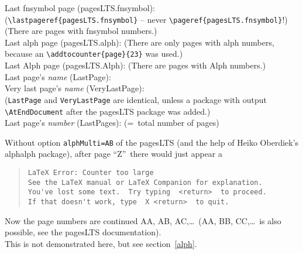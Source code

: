 \documentclass[british]{article}
\def\pagesLTSexamplealph{23}
\begin{document}
\noindent Last fnsymbol page (pagesLTS.fnsymbol):  \\
(\texttt{\textbackslash lastpageref\{pagesLTS.fnsymbol\}} -- never
\texttt{\textbackslash pageref\{pagesLTS.fnsymbol\}}!)\\
(There are  pages with fnsymbol numbers.)\\

\noindent Last alph page (pagesLTS.alph): 
(There are only  pages with alph numbers,
because an \texttt{\textbackslash addtocounter\{page\}\{\pagesLTSexamplealph\}} was used.)\\

\noindent Last Alph page (pagesLTS.Alph): 
(There are  pages with Alph numbers.)\\

\noindent Last page's \textit{name} (LastPage): \\

\noindent Very last page's \textit{name} (VeryLastPage): \\
(\texttt{LastPage} and \texttt{VeryLastPage} are identical, unless
a package with output \linebreak
\texttt{\textbackslash AtEndDocument} after the \textsf{pagesLTS} package
was added.)\\

\noindent Last page's \textit{number} (LastPages): 
(=~total number of pages)\\

\lipsum[1-3]

Without option \texttt{alphMulti=AB} of the \textsf{pagesLTS} (and the help of
Heiko Oberdiek's \textsf{alphalph} package), after page
\textquotedblleft Z\textquotedblright\ there would just appear a
\begin{quote}
\begin{verbatim}
LaTeX Error: Counter too large
See the LaTeX manual or LaTeX Companion for explanation.
You've lost some text.  Try typing  <return>  to proceed.
If that doesn't work, type  X <return>  to quit.
\end{verbatim}
\end{quote}
Now the page numbers are continued AA, AB, AC,\ldots\ (AA, BB, CC,\ldots\ is
also possible, see the \textsf{pagesLTS} documentation).\\
This is not demonstrated here, but see section~\ref{alph}.
\end{document}
